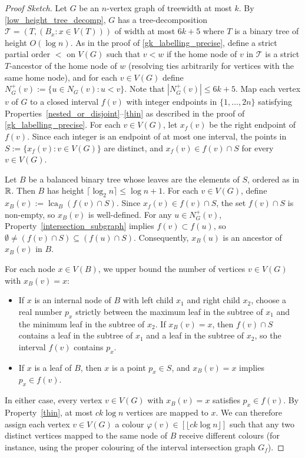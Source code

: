 \documentclass{patmorin}
\renewcommand{\le}{\leqslant}
\DeclareMathOperator{\lca}{lca}
\newcommand{\Oh}{O}
\newcommand{\calT}{\mathcal{T}}
\begin{document}
\begin{proof}[Proof Sketch]
  Let $G$ be an $n$-vertex graph of treewidth at most $k$.  By \cref{low_height_tree_decomp}, $G$ has a tree-decomposition $\calT=(T,(B_x:x\in V(T)))$ of width at most $6k+5$ where $T$ is a binary tree of height $\Oh(\log n)$. As in the proof of \cref{gk_labelling_precise}, define a strict partial order $<$ on $V(G)$ such that $v<w$ if the home node of $v$ in $\calT$ is a strict $T$-ancestor of the home node of $w$ (resolving ties arbitrarily for vertices with the same home node), and for each $v\in V(G)$ define $N^+_G(v):=\{u\in N_G(v):u<v\}$. Note that $|N^+_G(v)|\le 6k+5$.
  Map each vertex $v$ of $G$ to a closed interval $f(v)$ with integer endpoints in $\{1,\dots,2n\}$ satisfying Properties~\ref{nested_or_disjoint}--\ref{thin} as described in the proof of \cref{gk_labelling_precise}.
  For each $v\in V(G)$, let $x_f(v)$ be the right endpoint of $f(v)$. Since each integer is an endpoint of at most one interval, the points in $S:=\{x_f(v):v\in V(G)\}$ are distinct, and $x_f(v)\in f(v)\cap S$ for every $v\in V(G)$.

  Let $B$ be a balanced binary tree whose leaves are the elements of $S$, ordered as in $\mathbb{R}$. Then $B$ has height $\lceil \log_2 n\rceil \le \log n + 1$.
  For each $v\in V(G)$, define $x_B(v):=\lca_B(f(v)\cap S)$. Since $x_f(v)\in f(v)\cap S$, the set $f(v)\cap S$ is non-empty, so $x_B(v)$ is well-defined. For any $u\in N^+_G(v)$, Property~\ref{intersection_subgraph} implies $f(v)\subset f(u)$, so $\emptyset\neq (f(v)\cap S)\subseteq (f(u)\cap S)$. Consequently, $x_B(u)$ is an ancestor of $x_B(v)$ in $B$.

  For each node $x\in V(B)$, we upper bound the number of vertices $v\in V(G)$ with $x_B(v)=x$:
  \begin{itemize}[nosep,nolistsep]
    \item If $x$ is an internal node of $B$ with left child $x_1$ and right child $x_2$, choose a real number $p_x$ strictly between the maximum leaf in the subtree of $x_1$ and the minimum leaf in the subtree of $x_2$. If $x_B(v)=x$, then $f(v)\cap S$ contains a leaf in the subtree of $x_1$ and a leaf in the subtree of $x_2$, so the interval $f(v)$ contains $p_x$.
    \item If $x$ is a leaf of $B$, then $x$ is a point $p_x\in S$, and $x_B(v)=x$ implies $p_x\in f(v)$.
  \end{itemize}
  In either case, every vertex $v\in V(G)$ with $x_B(v)=x$ satisfies $p_x\in f(v)$. By Property~\ref{thin}, at most $ck\log n$ vertices are mapped to $x$. We can therefore assign each vertex $v\in V(G)$ a colour $\varphi(v)\in [\lfloor ck\log n\rfloor]$ such that any two distinct vertices mapped to the same node of $B$ receive different colours (for instance, using the proper colouring of the interval intersection graph $G_f$).


\end{proof}
\end{document}
